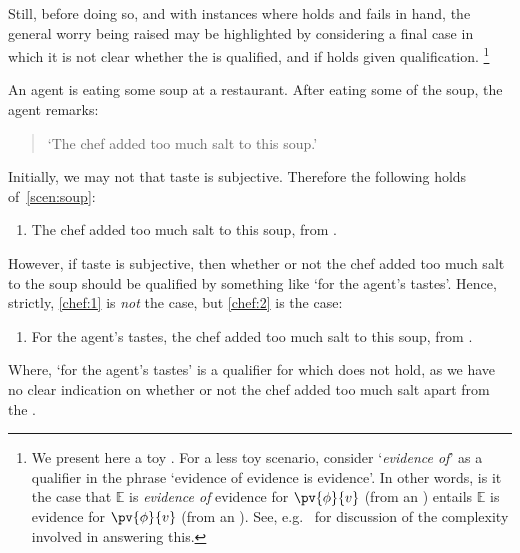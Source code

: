 \begin{note}
  Still, before doing so, and with instances where \ptivity{} holds and fails in hand, the general worry being raised may be highlighted by considering a final case in which it is not clear whether the \agpe{} is qualified, and if \ptivity{} holds given qualification.%
  \footnote{
    We present here a toy .
    For a less toy scenario, consider `\emph{evidence of}' as a qualifier in the phrase `evidence of evidence is evidence'.
    In other words, is it the case that \(\mathbb{E}\) is \emph{evidence of} evidence for \(\pv{\phi}{v}\) (from an \agpe{}) entails \(\mathbb{E}\) is evidence for \(\pv{\phi}{v}\) (from an \agpe{}).
    See, e.g.\ \textcite{Tal:2017uw} for discussion of the complexity involved in answering this.
  }

  \begin{scenario}[Soup]
    \label{scen:soup}
    An agent is eating some soup at a restaurant.
    After eating some of the soup, the agent remarks:
    \begin{quote}
      `The chef added too much salt to this soup.'
    \end{quote}
  \end{scenario}

  Initially, we may not that taste is subjective.
  Therefore the following holds of~\autoref{scen:soup}:
  \begin{enumerate}[label=\arabic*, ref=(\arabic*)]
  \item
    \label{chef:1}
    The chef added too much salt to this soup, from \agpe{}.
  \end{enumerate}

  However, if taste is subjective, then whether or not the chef added too much salt to the soup should be qualified by something like `for the agent's tastes'.
  Hence, strictly, \ref{chef:1} is \emph{not} the case, but \ref{chef:2} is the case:

  \begin{enumerate}[label=\arabic*, ref=(\arabic*), resume]
  \item
    \label{chef:2}
    For the agent's tastes, the chef added too much salt to this soup, from \agpe{}.
  \end{enumerate}

  Where, `for the agent's tastes' is a qualifier for which \ptivity{} does not hold, as we have no clear indication on whether or not the chef added too much salt apart from the \agpe{}.


\end{note}

